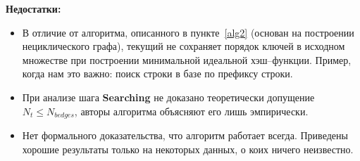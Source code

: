 \documentclass[specialist,
               substylefile = spbu.rtx,
               subf,href,colorlinks=true, 12pt]{disser}
\begin{document}
\textbf{Недостатки:}
\begin{itemize}
\item В отличие от алгоритма, описанного в пункте~\ref{alg2} (основан на построении нециклического графа), текущий не сохраняет порядок ключей в исходном множестве при построении минимальной идеальной хэш--функции. Пример, когда нам это важно: поиск строки в базе по префиксу строки.
\item При анализе шага \textbf{Searching} не доказано теоретически допущение $N_{t} \leq N_{bedges}$, авторы алгоритма объясняют его лишь эмпирически.
\item Нет формального доказательства, что алгоритм работает всегда. Приведены хорошие результаты только на некоторых данных, о коих ничего неизвестно.
\end{itemize}
\end{document}
